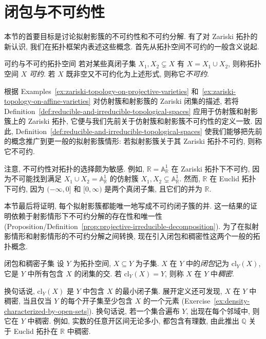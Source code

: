 \section{闭包与不可约性}\label{sec:closures-and-irreducibility}

本节的首要目标是讨论拟射影簇的不可约性和不可约分解. 有了对 Zariski 拓扑的新认识, 我们在拓扑框架内表述这些概念. 首先从拓扑空间不可约的一般含义说起.

\begin{Definition}{可约与不可约拓扑空间}\leavevmode\label{def:reducible-and-irreducible-topological-spaces}
若对某些真闭子集 $X_{1},X_{2}\subsetneq X$ 有 $X=X_{1}\cup X_{2}$, 则称拓扑空间 $X$ \emph{可约}. 若 $X$ 既非空又不可约化为上述形式, 则称它\emph{不可约}.
\end{Definition}

根据 Examples~\ref{ex:zariski-topology-on-projective-varieties} 和~\ref{ex:zariski-topology-on-affine-varieties} 对仿射簇和射影簇的 Zariski 闭集的描述, 若将 Definition~\ref{def:reducible-and-irreducible-topological-spaces} 应用于仿射簇和射影簇上的 Zariski 拓扑, 它便与我们先前关于仿射簇和射影簇不可约性的定义一致. 因此, Definition~\ref{def:reducible-and-irreducible-topological-spaces} 使我们能够把先前的概念推广到更一般的拟射影簇情形: 若拟射影簇关于其 Zariski 拓扑不可约, 则称它不可约.

注意, 不可约性对拓扑的选择颇为敏感. 例如, $\mathbb{R}=\mathbb{A}^{1}_{\mathbb{R}}$ 在 Zariski 拓扑下不可约, 因为不可能找到满足 $X_{1}\cup X_{2}=\mathbb{A}^{1}_{\mathbb{R}}$ 的仿射簇 $X_{1},X_{2}\subsetneq\mathbb{A}^{1}_{\mathbb{R}}$. 然而, $\mathbb{R}$ 在 Euclid 拓扑下可约, 因为 $(-\infty,0]$ 和 $[0,\infty)$ 是两个真闭子集, 且它们的并为 $\mathbb{R}$.

本节最后将证明, 每个拟射影簇都能唯一地写成不可约闭子簇的并. 这一结果的证明依赖于射影情形下不可约分解的存在性和唯一性 (Proposition/Definition~\ref{prop:projective-irreducible-decomposition}). 为了在拟射影情形和射影情形的不可约分解之间转换, 现在引入闭包和稠密性这两个一般的拓扑概念.

\begin{Definition}{闭包和稠密子集}\leavevmode\label{def:closure-and-dense-subset}
设 $Y$ 为拓扑空间, $X\subseteq Y$ 为子集. $X$ 在 $Y$ 中的\emph{闭包}记为 $\mathrm{cl}_{Y}(X)$, 它是 $Y$ 中所有包含 $X$ 的闭集的交. 若 $\mathrm{cl}_{Y}(X)=Y$, 则称 $X$ 在 $Y$ 中\emph{稠密}.
\end{Definition}

换句话说, $\mathrm{cl}_{Y}(X)$ 是 $Y$ 中包含 $X$ 的最小闭子集. 展开定义还可发现, $X$ 在 $Y$ 中稠密, 当且仅当 $Y$ 的每个开子集至少包含 $X$ 的一个元素 (Exercise~\ref{ex:density-characterized-by-open-sets}). 换句话说, 若一个集合遍布 $Y$, 出现在每个邻域中, 则它在 $Y$ 中稠密. 例如, 实数的任意开区间无论多小, 都包含有理数, 由此推出 $\mathbb{Q}$ 关于 Euclid 拓扑在 $\mathbb{R}$ 中稠密.

